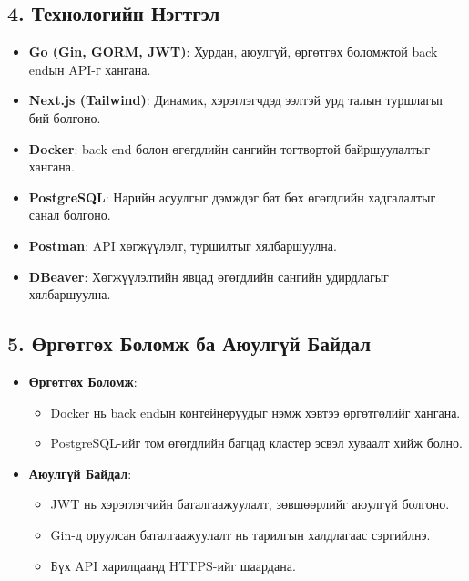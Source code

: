 \subsection*{4. Технологийн Нэгтгэл}
\begin{itemize}
    \item \textbf{Go (Gin, GORM, JWT)}: Хурдан, аюулгүй, өргөтгөх боломжтой back endын API-г хангана.
    \item \textbf{Next.js (Tailwind)}: Динамик, хэрэглэгчдэд ээлтэй урд талын туршлагыг бий болгоно.
    \item \textbf{Docker}: back end болон өгөгдлийн сангийн тогтвортой байршуулалтыг хангана.
    \item \textbf{PostgreSQL}: Нарийн асуулгыг дэмждэг бат бөх өгөгдлийн хадгалалтыг санал болгоно.
    \item \textbf{Postman}: API хөгжүүлэлт, туршилтыг хялбаршуулна.
    \item \textbf{DBeaver}: Хөгжүүлэлтийн явцад өгөгдлийн сангийн удирдлагыг хялбаршуулна.
\end{itemize}

\subsection*{5. Өргөтгөх Боломж ба Аюулгүй Байдал}
\begin{itemize}
    \item \textbf{Өргөтгөх Боломж}:
    \begin{itemize}
        \item Docker нь back endын контейнеруудыг нэмж хэвтээ өргөтгөлийг хангана.
        \item PostgreSQL-ийг том өгөгдлийн багцад кластер эсвэл хуваалт хийж болно.
    \end{itemize}
    \item \textbf{Аюулгүй Байдал}:
    \begin{itemize}
        \item JWT нь хэрэглэгчийн баталгаажуулалт, зөвшөөрлийг аюулгүй болгоно.
        \item Gin-д оруулсан баталгаажуулалт нь тарилгын халдлагаас сэргийлнэ.
        \item Бүх API харилцаанд HTTPS-ийг шаардана.
    \end{itemize}
\end{itemize}

